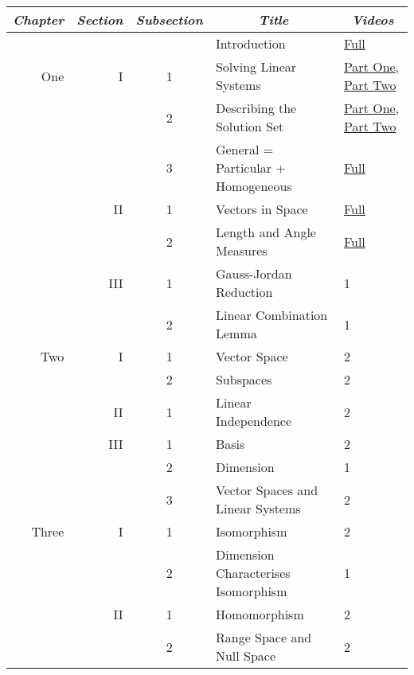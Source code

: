 \documentclass{article}
\begin{document}
\begin{center}
\begin{tabular}{|rrc|ll|}
  \multicolumn{1}{c}{\textit{Chapter}} 
  &\multicolumn{1}{c}{\textit{Section}} 
  &\multicolumn{1}{c}{\textit{Subsection}} 
  &\multicolumn{1}{c}{\textit{Title}} 
  &\multicolumn{1}{c}{\textit{Videos}} 
  \\ \hline
      &    &  &Introduction          &\href{https://youtu.be/i-aS6VrDomg}{Full}   \\
 \hline
  One &I   &1 &Solving Linear Systems             &\href{https://youtu.be/4e6AsXVIsFc}{Part One}, \href{https://youtu.be/lhkdzfWfwp0}{Part Two}   \\
      &    &2 &Describing the Solution Set        &\href{https://youtu.be/ExVBc05YQPg}{Part One}, \href{https://youtu.be/ZatFu5GVFbo}{Part Two}   \\
      &    &3 &General = Particular + Homogeneous &\href{https://youtu.be/OcayHebo62Q}{Full}   \\
      \cline{4-5}
      &II  &1  &Vectors in Space                  &\href{https://youtu.be/5UpMGlhtVf4}{Full}   \\
      &    &2  &Length and Angle Measures         &\href{https://youtu.be/-vzdOIP-a5A}{Full}   \\
      \cline{4-5}
      &III &1  &Gauss-Jordan Reduction            &1   \\
      &    &2  &Linear Combination Lemma          &1   \\
 \hline
 Two  &I   &1 &Vector Space                       &2   \\
      &    &2 &Subspaces                          &2   \\
      \cline{4-5}
      &II  &1 &Linear Independence                &2   \\
      \cline{4-5}
      &III &1 &Basis                              &2   \\
      &    &2 &Dimension                          &1   \\
      &    &3 &Vector Spaces and Linear Systems   &2   \\
 \hline
 Three&I   &1 &Isomorphism                        &2   \\
      &    &2 &Dimension Characterises Isomorphism&1   \\
      \cline{4-5}
      &II  &1 &Homomorphism                       &2   \\
      &    &2 &Range Space and Null Space         &2   \\
      \cline{4-5}

\end{tabular}
\end{center}
\end{document}
